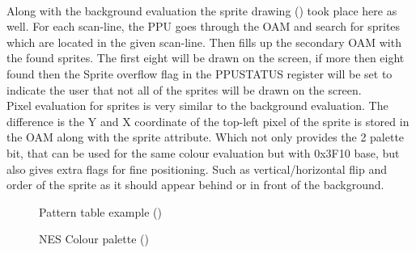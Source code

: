 \documentclass[]{report}
\begin{document}
\paragraph{ }
Along with the background evaluation the sprite drawing  (\cite{SRTE}) took place here as well. For each scan-line, the PPU goes through the OAM and search for sprites which are located in the given scan-line. Then fills up the secondary OAM with the found sprites. The first eight will be drawn on the screen, if more then eight found then the Sprite overflow flag in the PPUSTATUS register will be set to indicate the user that not all of the sprites will be drawn on the screen.
\\
Pixel evaluation for sprites is very similar to the background evaluation. The difference is the Y and X coordinate of the top-left pixel of the sprite is stored in the OAM along with the sprite attribute. Which not only provides the 2 palette bit, that can be used for the same colour evaluation but with 0x3F10 base, but also gives extra flags for fine positioning. Such as vertical/horizontal flip and order of the sprite as it should appear behind or in front of the background.
 
 

 
 \begin{figure}[!htb]
 	\caption{\label{fig:my-label} Pattern table example (\cite{PTRN})}
 	\caption{\label{fig:my-label} NES Colour palette (\cite{PALT})}
 \end{figure}
 \clearpage
\end{document}
